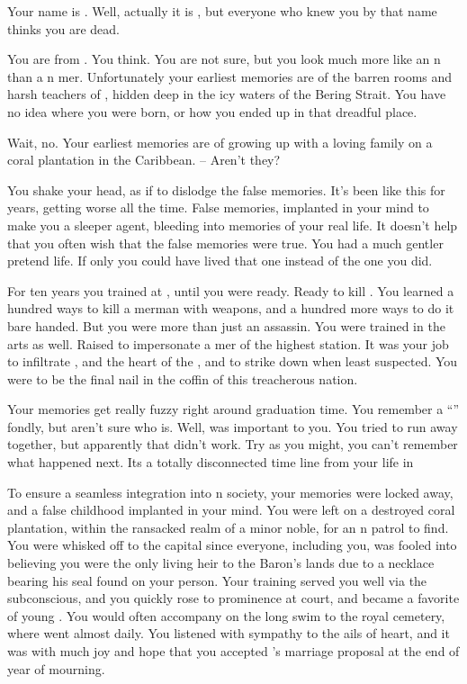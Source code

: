 \documentclass[char]{NeptuneBall}
\begin{document}
\name{\cQueen{}}


Your name is \cQueen{\MYname}. Well, actually it is \cQueen{\King} \cQueen{}, but everyone who knew you by that name thinks you are dead.

You are from \pAtlantis{}. You think. You are not sure, but you look much more like an \pAtlantis{}n than a \pPacifica{}n mer\cQueen{\human{}}. Unfortunately your earliest memories are of the barren rooms and harsh teachers of \pAssassin{}, hidden deep in the icy waters of the Bering Strait. You have no idea where you were born, or how you ended up in that dreadful place. 

Wait, no. Your earliest memories are of growing up with a loving family on a coral plantation in the Caribbean. -- Aren't they?

You shake your head, as if to dislodge the false memories. It's been like this for years, getting worse all the time. False memories, implanted in your mind to make you a sleeper agent, bleeding into memories of your real life. It doesn't help that you often wish that the false memories were true. You had a much gentler pretend life. If only you could have lived that one instead of the one you did.

For ten years you trained at \pAssassin{}, until you were ready. Ready to kill \cKing{\King} \cKing{}. You learned a hundred ways to kill a merman with weapons, and a hundred more ways to do it bare handed. But you were more than just an assassin. You were trained in the arts as well. Raised to impersonate a mer\cAthena{\human} of the highest station. It was your job to infiltrate \pAtlantis{}, and the heart of the \cKing{\King}, and to strike \cKing{\them} down when \pAtlantis{} least suspected. You were to be the final nail in the coffin of this treacherous nation.

Your memories get really fuzzy right around graduation time.  You remember a ``\cDiplomat{}'' fondly, but aren't sure who \cDiplomat{\they} is. Well, \cDiplomat{\they} was important to you. You tried to run away together, but apparently that didn't work. Try as you might, you can't remember what happened next. Its a totally disconnected time line from your life in \pAtlantis{}

To ensure a seamless integration into \pAtlantis{}n society, your memories were locked away, and a false childhood implanted in your mind. You were left on a destroyed coral plantation, within the ransacked realm of a minor noble, for an \pAtlantis{}n patrol to find. You were whisked off to the capital since everyone, including you, was fooled into believing you were the only living heir to the Baron's lands due to a necklace bearing his seal found on your person. Your training served you well via the subconscious, and you quickly rose to prominence at court, and became a favorite of young \cKing{\King} \cKing{}. You would often accompany \cKing{\them} on the long swim to the royal cemetery, where \cKing{\they} went almost daily. You listened with sympathy to the ails of \cKing{\their} heart, and it was with much joy and hope that you accepted \cKing{\King} \cKing{}'s marriage proposal at the end of \cKing{\their} year of mourning.
\end{document}
